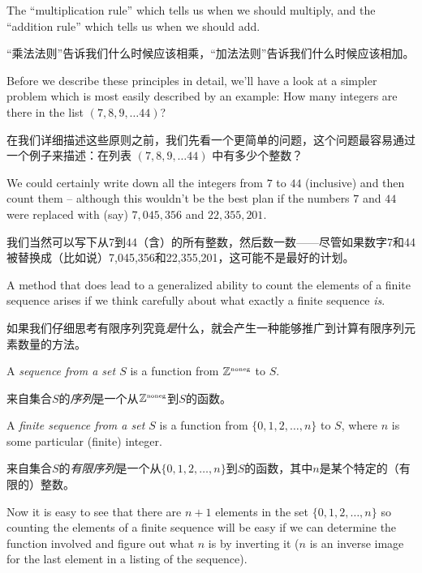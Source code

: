 The ``multiplication rule'' which
tells us when we should multiply, and the ``addition rule'' which tells
us when we should add.

“乘法法则”告诉我们什么时候应该相乘，“加法法则”告诉我们什么时候应该相加。

Before we describe these principles in detail,
we'll have a look at a simpler problem which is most easily described
by an example: How many integers are there in the list $(7,8,9,\ldots 44)$?

在我们详细描述这些原则之前，我们先看一个更简单的问题，这个问题最容易通过一个例子来描述：在列表 $(7,8,9,\ldots 44)$ 中有多少个整数？

We could certainly write down all the integers from $7$ to $44$ (inclusive) 
and then count them -- although this wouldn't be the best plan if the numbers
$7$ and $44$ were replaced with (say) $7,045,356$ and $22,355,201$.

我们当然可以写下从7到44（含）的所有整数，然后数一数——尽管如果数字7和44被替换成（比如说）7,045,356和22,355,201，这可能不是最好的计划。

A method
that does lead to a generalized ability to count the elements of a finite
sequence arises if we think carefully about what exactly a finite sequence 
\emph{is}.

如果我们仔细思考有限序列究竟\emph{是}什么，就会产生一种能够推广到计算有限序列元素数量的方法。

\begin{defi}
A \emph{sequence from a set $S$} is a function from 
${\mathbb Z}^{\mbox{\tiny noneg}}$ to $S$.
\end{defi}

\begin{defi}
来自集合$S$的\emph{序列}是一个从${\mathbb Z}^{\mbox{\tiny noneg}}$到$S$的函数。
\end{defi}

\begin{defi}
A \emph{finite sequence from a set $S$} is a 
function from $\{0, 1, 2, \ldots , n\}$ to $S$, where $n$ is some 
particular (finite) integer.
\end{defi}

\begin{defi}
来自集合$S$的\emph{有限序列}是一个从$\{0, 1, 2, \ldots , n\}$到$S$的函数，其中$n$是某个特定的（有限的）整数。
\end{defi}

Now it is easy to see that there are $n+1$ elements in the set
$\{0, 1, 2, \ldots , n \}$ so counting the elements of a finite
sequence will be easy if we can determine the function involved 
and figure out what $n$ is by inverting it ($n$ is an inverse image
for the last element in a listing of the sequence).

